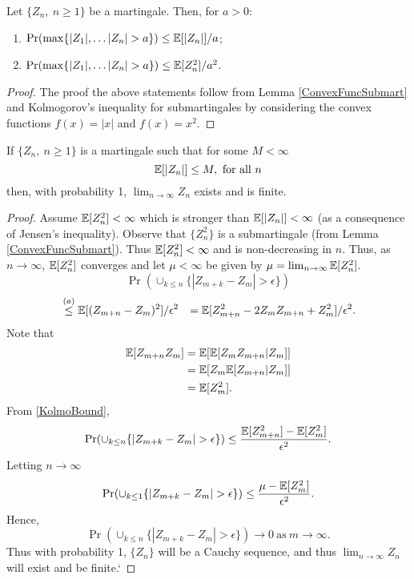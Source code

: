 \documentclass[a4paper,10pt,english]{article}
\begin{document}
\begin{cor}
\label{MartingaleBoundCor}
Let $\{Z_n,~n \geq 1\}$ be a martingale. Then, for $a>0$:
\begin{enumerate}
\item $\Pr(\max\{|Z_1|, \hdots |Z_n|>a\}) \leq \E[|Z_n|]/a$;
\item $\Pr(\max\{|Z_1|, \hdots |Z_n|>a\}) \leq \E[Z_n^2]/a^2$.
\end{enumerate} 
\end{cor}
\begin{proof}
The proof the above statements follow from Lemma \ref{ConvexFuncSubmart} and Kolmogorov's inequality for submartingales by considering the convex functions $f(x)=|x|$ and $f(x)=x^2$. 
\end{proof}
\begin{thm}
\label{MartingaleConvergenceTheorem}
If $\{Z_n,~n \geq 1\}$ is a martingale such that for some $M< \infty$
\begin{equation*}
\mathbb{E}[|Z_n|] \leq M, ~ \text{for all}~ n
\end{equation*}
then, with probability 1, $\lim_{n \rightarrow \infty}Z_n$ exists and is finite.
\end{thm}
\begin{proof}
Assume $\mathbb{E}[Z_n^2]< \infty$ which is stronger than $\mathbb{E}[|Z_n|]< \infty$ (as a consequence of Jensen's inequality). Observe that $\{Z_n^2\}$ is a submartingale (from Lemma \ref{ConvexFuncSubmart}). Thus $\mathbb{E}[Z_n^2]<\infty$ and is non-decreasing in $n$. Thus, as $n \rightarrow \infty$, $\mathbb{E}[Z_n^2]$ converges and let $\mu<\infty$ be given by $\mu=\lim_{n \rightarrow \infty}\mathbb{E}[Z_n^2]$.
\begin{equation}
\label{KolmoBound}
\Pr(\cup_{k \leq n} \{|Z_{m+k}-Z_m|> \epsilon\} )
\end{equation}  
\begin{eqnarray*}
&\stackrel{(a)}{\leq }\mathbb{E}[(Z_{m+n}-Z_m)^2]/\epsilon^2
&=\mathbb{E}[Z_{m+n}^2-2Z_mZ_{m+n}+Z_m^2]/\epsilon^2.
\end{eqnarray*}
Note that 
\begin{eqnarray*}
\mathbb{E}[Z_{m+n}Z_m]&=\mathbb{E}[\mathbb{E}[Z_mZ_{m+n}|Z_m]]\\
&=\mathbb{E}[Z_m\mathbb{E}[Z_{m+n}|Z_m]]\\
&=\mathbb{E}[Z_m^2].
\end{eqnarray*}
From \ref{KolmoBound}, 
\begin{equation*}
\Pr(\cup_{k \leq n} \{|Z_{m+k}-Z_m|> \epsilon\}) \leq \frac{\E[Z_{m+n}^2]-\E[Z_m^2]}{\epsilon^2}.
\end{equation*}
Letting $n \rightarrow \infty$
\begin{equation*}
\Pr(\cup_{k \leq 1} \{|Z_{m+k}-Z_m|> \epsilon\}) \leq \frac{\mu-\E[Z_m^2]}{\epsilon^2}.
\end{equation*}
Hence,
\begin{equation*}
\Pr(\cup_{k \leq n} \{|Z_{m+k}-Z_m|> \epsilon\}) \rightarrow 0 ~\text{as}~ m \rightarrow \infty.
\end{equation*}
Thus with probability 1, $\{Z_n\}$ will be  a Cauchy sequence, and thus $\lim_{n \rightarrow \infty}Z_n$ will exist and be finite.`
\end{proof}
\end{document}
